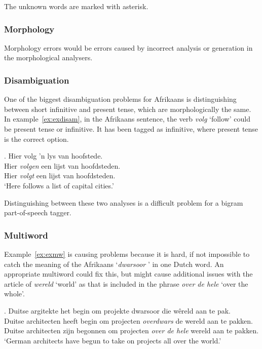 \documentclass[11pt]{article}
\begin{document}
The unknown words are marked with asterisk.

\subsubsection{Morphology}

Morphology errors would be errors caused by incorrect analysis or generation in the morphological analysers.

\subsubsection{Disambiguation}

One of the biggest disambiguation problems for Afrikaans is distinguishing between short infinitive and present 
tense, which are morphologically the same. In example~\ref{ex:exdisam}, in the Afrikaans sentence, the verb 
{\em volg} `follow' could be present tense or infinitive. It has been tagged as infinitive, where present tense 
is the correct option.

\ex. \label{ex:exdisam} 
    Hier volg 'n lys van hoofstede. \\
    Hier {\em volgen} een lijst van hoofdsteden. \\
    Hier {\em volgt} een lijst van hoofdsteden.  \\
   `Here follows a list of capital cities.'

Distinguishing between these two analyses is a difficult problem for a bigram part-of-speech tagger.

\subsubsection{Multiword}

Example~\ref{ex:exmw} is causing problems because it is hard, if not impossible to catch the meaning of the 
Afrikaans `{\em dwarsoor}  ' in one Dutch word. An appropriate multiword could fix this, but might 
cause additional issues with the article of {\em wereld} `world' as that is included in the 
phrase {\em over de hele} `over the whole'.

\ex. \label{ex:exmw} 
    Duitse argitekte het begin om projekte dwarsoor die wêreld aan te pak. \\
    Duitse architecten heeft begin om projecten {\em overdwars} de wereld aan te pakken. \\
    Duitse architecten zijn begonnen om projecten {\em over de hele} wereld aan te pakken. \\
   `German architects have begun to take on projects all over the world.'
\end{document}
